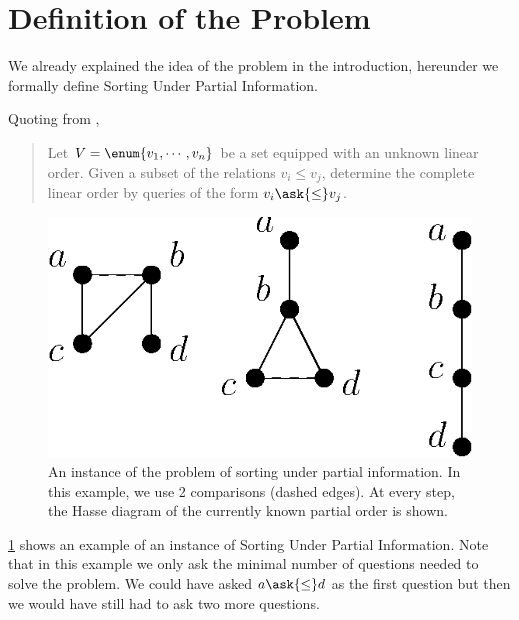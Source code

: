 \section{Definition of the Problem}

We already explained the idea of the problem in the introduction, hereunder we
formally define Sorting Under Partial Information.

Quoting from \cite{cardinal:2013},

\begin{quotation}
Let $V = \enum{v_1 , \cdots , v_n}$ be a set
equipped with an unknown linear order. Given a subset of the relations $v_i
\leq v_j$, determine the complete linear order by queries of the form
\(v_i \ask{\leq} v_j\).
\end{quotation}


\begin{figure} \centering \includegraphics[height=0.2\textheight]{fig/supi/ex2}
\caption{An instance of the problem of sorting under partial information. In
this example, we use 2 comparisons (dashed edges). At every step, the Hasse
diagram of the currently known partial order is shown.}
\label{fig:supi:def:ex2} \end{figure}


\ref{fig:supi:def:ex2} shows an example of an instance of Sorting Under Partial
Information. Note that in this example we only ask the minimal number of
questions needed to solve the problem. We could have asked $a \ask{\le}
d$ as the first question but then we would have still had to ask two more
questions.
